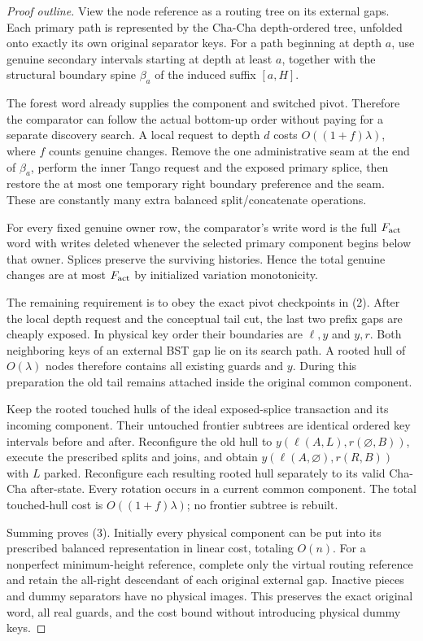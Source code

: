 \documentclass[11pt]{article}
\begin{document}
\begin{proof}[Proof outline]
View the node reference as a routing tree on its external gaps. Each
primary path is represented by the Cha-Cha depth-ordered tree,
unfolded onto exactly its own original separator keys. For a path
beginning at depth $a$, use genuine secondary intervals starting at
depth at least $a$, together with the structural boundary spine
$\beta_a$ of the induced suffix $[a,H]$.

The forest word already supplies the component and switched pivot.
Therefore the comparator can follow the actual bottom-up order without
paying for a separate discovery search. A local request to depth $d$
costs $O((1+f)\lambda)$, where $f$ counts genuine changes. Remove
the one administrative seam at the end of $\beta_a$, perform the inner
Tango request and the exposed primary splice, then restore the at most
one temporary right boundary preference and the seam. These are
constantly many extra balanced split/concatenate operations.

For every fixed genuine owner row, the comparator's write word is the
full $F_{\rm act}$ word with writes deleted whenever the selected
primary component begins below that owner. Splices preserve the
surviving histories. Hence the total genuine changes are at most
$F_{\rm act}$ by initialized variation monotonicity.

The remaining requirement is to obey the exact pivot checkpoints in
(2). After the local depth request and the conceptual tail cut, the
last two prefix gaps are cheaply exposed. In physical key order their
boundaries are $\ell,y$ and $y,r$. Both neighboring keys of an external
BST gap lie on its search path. A rooted hull of $O(\lambda)$ nodes
therefore contains all existing guards and $y$. During this preparation
the old tail remains attached inside the original common component.

Keep the rooted touched hulls of the ideal exposed-splice transaction
and its incoming component. Their untouched frontier subtrees are
identical ordered key intervals before and after. Reconfigure the
old hull to $y(\ell(A,L),r(\varnothing,B))$, execute the prescribed
splits and joins, and obtain $y(\ell(A,\varnothing),r(R,B))$ with
$L$ parked. Reconfigure each resulting rooted hull separately to its
valid Cha-Cha after-state. Every rotation occurs in a current
common component. The total touched-hull cost is
$O((1+f)\lambda)$; no frontier subtree is rebuilt.

Summing proves (3). Initially every physical component can be put
into its prescribed balanced representation in linear cost, totaling
$O(n)$. For a nonperfect minimum-height reference, complete only the
virtual routing reference and retain the all-right descendant of
each original external gap. Inactive pieces and dummy separators have
no physical images. This preserves the exact original word, all real
guards, and the cost bound without introducing physical dummy keys.
\end{proof}
\end{document}
